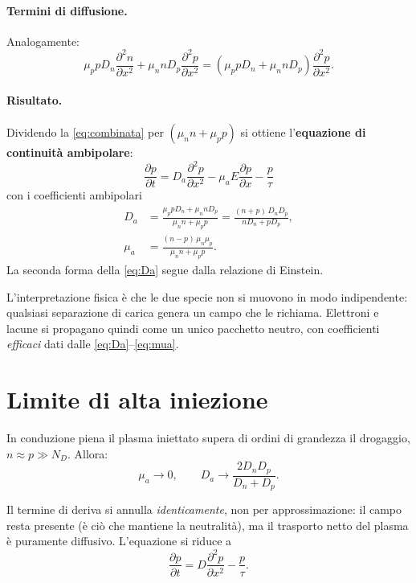 \documentclass[11pt,a4paper]{article}
\newcommand{\dpar}[2]{\frac{\partial #1}{\partial #2}}
\newcommand{\dparq}[2]{\frac{\partial^2 #1}{\partial #2^2}}
\begin{document}
\paragraph{Termini di diffusione.} Analogamente:
\begin{equation}
  \mu_p p D_n \dparq{n}{x} + \mu_n n D_p \dparq{p}{x}
  = \left( \mu_p p D_n + \mu_n n D_p \right) \dparq{p}{x}.
\end{equation}

\paragraph{Risultato.} Dividendo la \eqref{eq:combinata} per $(\mu_n n + \mu_p p)$ si
ottiene l'\textbf{equazione di continuit\`a ambipolare}:
\begin{equation}
  \boxed{\;
  \dpar{p}{t} = D_a \dparq{p}{x} - \mu_a E \dpar{p}{x} - \frac{p}{\tau}
  \;}
  \label{eq:ambipolare}
\end{equation}
con i coefficienti ambipolari
\begin{align}
  D_a &= \frac{\mu_p p D_n + \mu_n n D_p}{\mu_n n + \mu_p p}
       = \frac{(n+p)\,D_n D_p}{n D_n + p D_p}, \label{eq:Da}\\[4pt]
  \mu_a &= \frac{(n-p)\,\mu_n \mu_p}{\mu_n n + \mu_p p}. \label{eq:mua}
\end{align}
La seconda forma della \eqref{eq:Da} segue dalla relazione di Einstein.

L'interpretazione fisica \`e che le due specie non si muovono in modo indipendente:
qualsiasi separazione di carica genera un campo che le richiama. Elettroni e lacune si
propagano quindi come un unico pacchetto neutro, con coefficienti \emph{efficaci} dati
dalle \eqref{eq:Da}--\eqref{eq:mua}.

\section{Limite di alta iniezione}

In conduzione piena il plasma iniettato supera di ordini di grandezza il drogaggio,
$n \approx p \gg N_D$. Allora:
\begin{equation}
  \mu_a \longrightarrow 0, \qquad
  D_a \longrightarrow \frac{2 D_n D_p}{D_n + D_p} .
\end{equation}

Il termine di deriva si annulla \emph{identicamente}, non per approssimazione: il campo
resta presente (\`e ci\`o che mantiene la neutralit\`a), ma il trasporto netto del
plasma \`e puramente diffusivo. L'equazione si riduce a
\begin{equation}
  \dpar{p}{t} = D \dparq{p}{x} - \frac{p}{\tau} .
  \label{eq:diffusione}
\end{equation}
\end{document}
